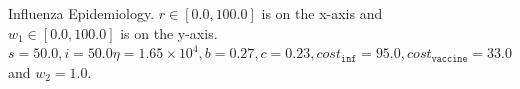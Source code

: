 \begin{figure}[h!]
    \centering
    \caption{Influenza Epidemiology. $ r \in \left[ 0.0, 100.0 \right]$ is on the x-axis and $ w_1 \in \left[ 0.0, 100.0 \right]$ is on the y-axis. $ s = 50.0, i = 50.0 \eta = 1.65 \times 10^4, b = 0.27, c = 0.23, cost_{\mathtt{inf}} = 95.0, cost_{\mathtt{vaccine}} = 33.0$ and $w_2 = 1.0 $.}
    \label{fig:robot1d}
\end{figure}

